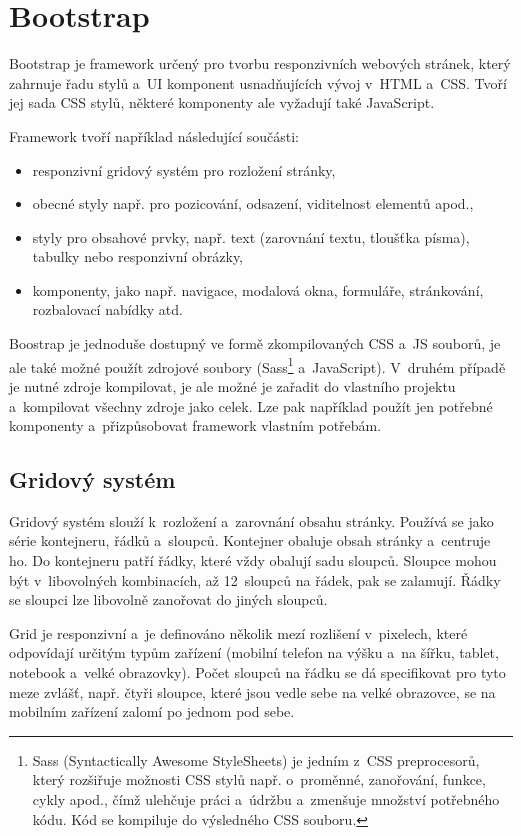 \documentclass[
  digital, %
  oneside, %
  table,   %
  nolof,     %
  nolot,     %
  nocover
]{fithesis3}
\begin{document}
\section{Bootstrap}
Bootstrap je framework určený pro tvorbu responzivních webových stránek, který zahrnuje řadu stylů a~UI komponent usnadňujících vývoj v~HTML a~CSS. Tvoří jej sada CSS stylů, některé komponenty ale vyžadují také JavaScript.\par
Framework tvoří například následující součásti: \cite{bootstrapcom}
\begin{itemize}
  \item responzivní gridový systém pro rozložení stránky,
  \item obecné styly např. pro pozicování, odsazení, viditelnost elementů apod.,
  \item styly pro obsahové prvky, např. text (zarovnání textu, tloušťka písma), tabulky nebo responzivní obrázky,
  \item komponenty, jako např. navigace, modalová okna, formuláře, stránkování, rozbalovací nabídky atd.
\end{itemize}
Boostrap je jednoduše dostupný ve formě zkompilovaných CSS a~JS souborů, je ale také možné použít zdrojové soubory (Sass\footnote{Sass (Syntactically Awesome StyleSheets) je jedním z~CSS preprocesorů, který rozšiřuje možnosti CSS stylů např. o~proměnné, zanořování, funkce, cykly apod., čímž ulehčuje práci a~údržbu a~zmenšuje množství potřebného kódu. Kód se kompiluje do výsledného CSS souboru.} a~JavaScript). V~druhém případě je nutné zdroje kompilovat, je ale možné je zařadit do vlastního projektu a~kompilovat všechny zdroje jako celek. Lze pak například použít jen potřebné komponenty a~přizpůsobovat framework vlastním potřebám.

\subsection{Gridový systém}
Gridový systém slouží k~rozložení a~zarovnání obsahu stránky. Používá se jako série kontejneru, řádků a~sloupců. \cite{bootstrapcom} Kontejner obaluje obsah stránky a~centruje ho. Do kontejneru patří řádky, které vždy obalují sadu sloupců. Sloupce mohou být v~libovolných kombinacích, až 12~sloupců na řádek, pak se zalamují. Řádky se sloupci lze libovolně zanořovat do jiných sloupců.\par
Grid je responzivní a~je definováno několik mezí rozlišení v~pixel\-ech, které odpovídají určitým typům zařízení (mobilní telefon na výšku a~na šířku, tablet, notebook a~velké obrazovky). Počet sloupců na řádku se dá specifikovat pro tyto meze zvlášť, např. čtyři sloupce, které jsou vedle sebe na velké obrazovce, se na mobilním zařízení zalomí po jednom pod sebe.
\end{document}
